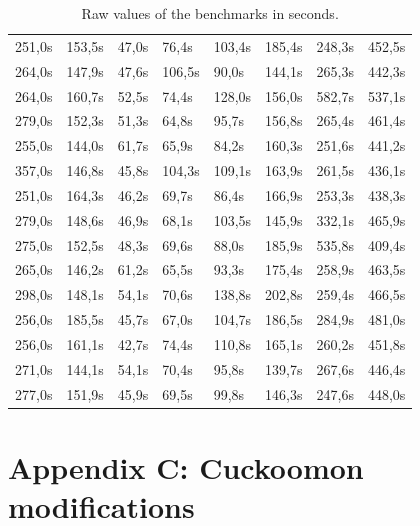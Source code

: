 \documentclass{scrartcl}
\begin{document}
\begin{table}[h]
\begin{tabular}{@{}llllllll@{}}
251,0s  & 153,5s  & 47,0s       & 76,4s       & 103,4s       & 185,4s       & 248,3s       & 452,5s        \\
264,0s  & 147,9s  & 47,6s       & 106,5s      & 90,0s        & 144,1s       & 265,3s       & 442,3s        \\
264,0s  & 160,7s  & 52,5s       & 74,4s       & 128,0s       & 156,0s       & 582,7s       & 537,1s        \\
279,0s  & 152,3s  & 51,3s       & 64,8s       & 95,7s        & 156,8s       & 265,4s       & 461,4s        \\
255,0s  & 144,0s  & 61,7s       & 65,9s       & 84,2s        & 160,3s       & 251,6s       & 441,2s        \\
357,0s  & 146,8s  & 45,8s       & 104,3s      & 109,1s       & 163,9s       & 261,5s       & 436,1s        \\
251,0s  & 164,3s  & 46,2s       & 69,7s       & 86,4s        & 166,9s       & 253,3s       & 438,3s        \\
279,0s  & 148,6s  & 46,9s       & 68,1s       & 103,5s       & 145,9s       & 332,1s       & 465,9s        \\
275,0s  & 152,5s  & 48,3s       & 69,6s       & 88,0s        & 185,9s       & 535,8s       & 409,4s        \\
265,0s  & 146,2s  & 61,2s       & 65,5s       & 93,3s        & 175,4s       & 258,9s       & 463,5s        \\
298,0s  & 148,1s  & 54,1s       & 70,6s       & 138,8s       & 202,8s       & 259,4s       & 466,5s        \\
256,0s  & 185,5s  & 45,7s       & 67,0s       & 104,7s       & 186,5s       & 284,9s       & 481,0s        \\
256,0s  & 161,1s  & 42,7s       & 74,4s       & 110,8s       & 165,1s       & 260,2s       & 451,8s        \\
271,0s  & 144,1s  & 54,1s       & 70,4s       & 95,8s        & 139,7s       & 267,6s       & 446,4s        \\
277,0s  & 151,9s  & 45,9s       & 69,5s       & 99,8s        & 146,3s       & 247,6s       & 448,0s        \\ \bottomrule
\end{tabular}
\caption{Raw values of the benchmarks in seconds.}
\label{rawdata}
\end{table}

\clearpage

\section*{Appendix C: Cuckoomon modifications}
\label{cuckoomonmods}
\end{document}

